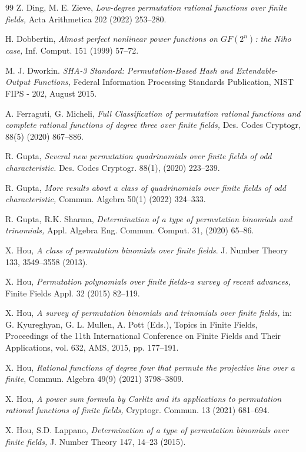 \documentclass[12pt]{amsart}
\numberwithin{equation}{section}
\theoremstyle{definition}
\begin{document}
\begin{thebibliography}{99}
 Z. Ding, M. E. Zieve, {\it Low-degree permutation rational functions over finite fields,} Acta Arithmetica 202 (2022) 253--280.

  H. Dobbertin, {\it Almost perfect nonlinear power functions on $GF(2^n)$: the Niho case,} Inf. Comput. 151 (1999) 57--72.

 M. J. Dworkin.   {\it SHA-3 Standard:  Permutation-Based Hash and Extendable-Output Functions,} Federal Information Processing Standards Publication, NIST FIPS - 202, August 2015.

 A. Ferraguti, G. Micheli, {\it Full Classification of permutation rational functions and complete rational functions of degree three over finite fields,} Des. Codes Cryptogr, 88(5) (2020) 867--886.

 R. Gupta, {\it Several new permutation quadrinomials over finite fields of odd  characteristic.} Des. Codes Cryptogr. 88(1), (2020) 223--239.

 R. Gupta, {\it More results about a class of quadrinomials over finite fields of odd characteristic,} Commun. Algebra 50(1) (2022) 324--333.

 R. Gupta, R.K. Sharma, {\it Determination of a type of permutation binomials and trinomials,} Appl. Algebra Eng. Commun. Comput. 31, (2020) 65--86.

 X. Hou, {\it A class of permutation binomials over finite fields}. J. Number Theory 133, 3549--3558 (2013).

 X. Hou, {\it Permutation polynomials over finite fields-a survey of recent advances,} Finite Fields Appl. 32 (2015) 82--119.

  X. Hou, {\it A survey of permutation binomials and trinomials over finite fields,} in: G. Kyureghyan, G. L. Mullen, A. Pott (Eds.), Topics in Finite Fields, Proceedings of the 11th International Conference on Finite Fields and Their Applications, vol. 632, AMS, 2015, pp. 177--191.

 X. Hou, {\it Rational functions of degree four that permute the projective line over a finite}, Commun. Algebra 49(9) (2021) 3798--3809.

 X. Hou, {\it A power sum formula by Carlitz and its applications to permutation rational functions of finite fields,} Cryptogr. Commun. 13 (2021) 681--694.

 X. Hou, S.D. Lappano, {\it Determination of a type of permutation binomials over finite fields,} J. Number Theory 147, 14--23 (2015).


\end{thebibliography}
\end{document}

